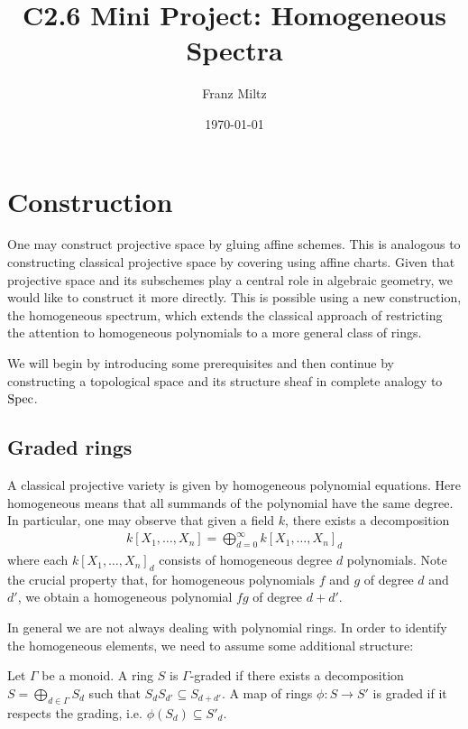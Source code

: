 \documentclass{article}
\begin{document}
\title{C2.6 Mini Project: Homogeneous Spectra}
\author{Franz Miltz}
\date{\today}
\maketitle

\section{Construction}

One may construct projective space by gluing affine schemes.
This is analogous to constructing classical projective space by covering
using affine charts. Given that projective space and its subschemes
play a central role in algebraic geometry, we would like to construct
it more directly. This is possible using a new construction, the
homogeneous spectrum, which extends the classical approach of restricting
the attention to homogeneous polynomials to a more general class of rings.

We will begin by introducing some prerequisites and then continue by
constructing a topological space and its structure sheaf in
complete analogy to $\operatorname{Spec}$.

\subsection{Graded rings}

A classical projective variety is given by homogeneous polynomial
equations. Here homogeneous means that all summands of the polynomial
have the same degree. In particular, one may observe that given a field $k$,
there exists a decomposition
\begin{align*}
  k[X_1,\ldots,X_n] = \bigoplus_{d=0}^\infty k[X_1,\ldots,X_n]_d
\end{align*}
where each $k[X_1,\ldots,X_n]_d$ consists of homogeneous degree $d$
polynomials. Note the crucial property that, for homogeneous polynomials $f$
and $g$ of degree $d$ and $d'$, we obtain a homogeneous polynomial $fg$ of
degree $d+d'$.

In general we are not always dealing with polynomial rings. In order
to identify the homogeneous elements, we need to assume some
additional structure:

\begin{definition}
  Let $\Gamma$ be a monoid.
  A ring $S$ is $\Gamma$-graded if there exists a decomposition
  $S = \bigoplus_{d\in \Gamma} S_d$
  such that $S_d S_{d'} \subseteq S_{d+d'}$.
  A map of rings $\phi : S\to S'$ is graded if it
  respects the grading, i.e. $\phi(S_d) \subseteq S'_d$.
\end{definition}
\end{document}
